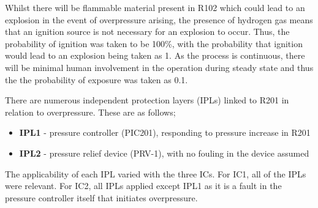 Whilst there will be flammable material present in R102 which could lead to an explosion in the event of overpressure arising, the presence of hydrogen gas means that an ignition source is not necessary for an explosion to occur. Thus, the probability of ignition was taken to be 100\%, with the probability that ignition would lead to an explosion being taken as 1. As the process is continuous, there will be minimal human involvement in the operation during steady state and thus the the probability of exposure was taken as 0.1. 
 

 
 There are numerous  independent protection layers (IPLs) linked to R201 in relation to overpressure. These are as follows;
 
 \begin{itemize}
\item  \textbf{IPL1} - pressure controller (PIC201), responding to pressure increase in R201
\item  \textbf{IPL2} - pressure relief device (PRV-1), with no fouling in the device assumed
 \end{itemize}



The applicability of each IPL varied with the three ICs. For IC1, all of the IPLs were relevant. For IC2, all IPLs applied except IPL1 as it is a fault in the pressure controller itself that initiates overpressure. 







 